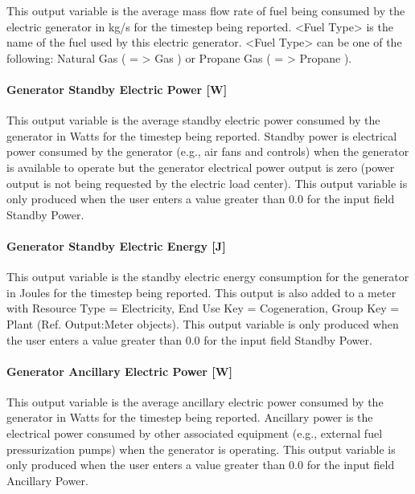 This output variable is the average mass flow rate of fuel being consumed by the electric generator in kg/s for the timestep being reported. \textless{}Fuel Type\textgreater{} is the name of the fuel used by this electric generator. \textless{}Fuel Type\textgreater{} can be one of the following: Natural Gas ( = \textgreater{} Gas ) or Propane Gas ( = \textgreater{} Propane ).

\paragraph{Generator Standby Electric Power {[}W{]}}\label{generator-standby-electric-power-w}

This output variable is the average standby electric power consumed by the generator in Watts for the timestep being reported. Standby power is electrical power consumed by the generator (e.g., air fans and controls) when the generator is available to operate but the generator electrical power output is zero (power output is not being requested by the electric load center). This output variable is only produced when the user enters a value greater than 0.0 for the input field Standby Power.

\paragraph{Generator Standby Electric Energy {[}J{]}}\label{generator-standby-electric-energy-j}

This output variable is the standby electric energy consumption for the generator in Joules for the timestep being reported. This output is also added to a meter with Resource Type = Electricity, End Use Key = Cogeneration, Group Key = Plant (Ref. Output:Meter objects). This output variable is only produced when the user enters a value greater than 0.0 for the input field Standby Power.

\paragraph{Generator Ancillary Electric Power {[}W{]}}\label{generator-ancillary-electric-power-w}

This output variable is the average ancillary electric power consumed by the generator in Watts for the timestep being reported. Ancillary power is the electrical power consumed by other associated equipment (e.g., external fuel pressurization pumps) when the generator is operating. This output variable is only produced when the user enters a value greater than 0.0 for the input field Ancillary Power.

